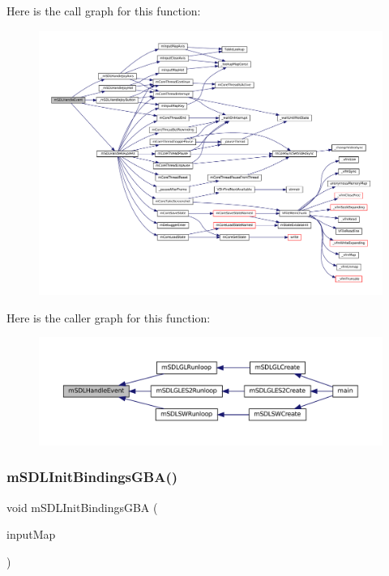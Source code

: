 Here is the call graph for this function\+:
\nopagebreak
\begin{figure}[H]
\begin{center}
\leavevmode
\includegraphics[width=350pt]{sdl-events_8h_a32623e2272fd40a24e3941e351a273a4_cgraph}
\end{center}
\end{figure}
Here is the caller graph for this function\+:
\nopagebreak
\begin{figure}[H]
\begin{center}
\leavevmode
\includegraphics[width=350pt]{sdl-events_8h_a32623e2272fd40a24e3941e351a273a4_icgraph}
\end{center}
\end{figure}
\mbox{\label{sdl-events_8h_a254830bd4cde57bec6bf2dade355902f}} 
\subsubsection{\texorpdfstring{m\+S\+D\+L\+Init\+Bindings\+G\+B\+A()}{mSDLInitBindingsGBA()}}
{\footnotesize\ttfamily void m\+S\+D\+L\+Init\+Bindings\+G\+BA (\begin{DoxyParamCaption}\item[{struct m\+Input\+Map $\ast$}]{input\+Map }\end{DoxyParamCaption})}

